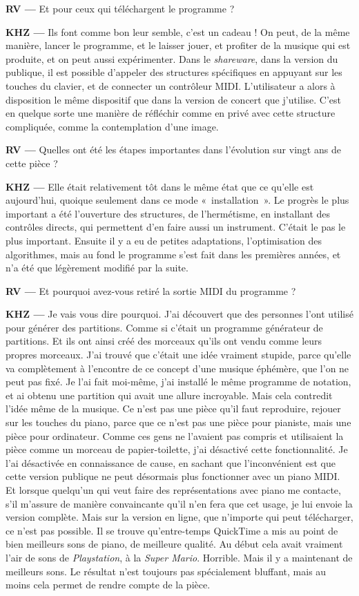 \documentclass[a4paper,12pt]{article}
\newcommand{\guill}[1]{«~#1~»}
\begin{document}
\textbf{RV ---} Et pour ceux qui téléchargent le programme ?

\textbf{KHZ ---} Ils font comme bon leur semble, c'est un cadeau ! On peut, de la même manière, lancer le programme, et le laisser jouer, et profiter de la musique qui est produite, et on peut aussi expérimenter. Dans le \emph{shareware}, dans la version du publique, il est possible d'appeler des structures spécifiques en appuyant sur les touches du clavier, et de connecter un contrôleur MIDI. L'utilisateur a alors à disposition le même dispositif que dans la version de concert que j'utilise. C'est en quelque sorte une manière de réfléchir comme en privé avec cette structure compliquée, comme la contemplation d'une image.

\textbf{RV ---} Quelles ont été les étapes importantes dans l'évolution sur vingt ans de cette pièce ?

\textbf{KHZ ---} Elle était relativement tôt dans le même état que ce qu'elle est aujourd'hui, quoique seulement dans ce mode \guill{installation}. Le progrès le plus important a été l'ouverture des structures, de l'hermétisme, en installant des contrôles directs, qui permettent d'en faire aussi un instrument. C'était le pas le plus important. Ensuite il y a eu de petites adaptations, l'optimisation des algorithmes, mais au fond le programme s'est fait dans les premières années, et n'a été que légèrement modifié par la suite.

\textbf{RV ---} Et pourquoi avez-vous retiré la sortie MIDI du programme ?

\textbf{KHZ ---} Je vais vous dire pourquoi. J'ai découvert que des personnes l'ont utilisé pour générer des partitions. Comme si c'était un programme générateur de partitions. Et ils ont ainsi créé des morceaux qu'ils ont vendu comme leurs propres morceaux. J'ai trouvé que c'était une idée vraiment stupide, parce qu'elle va complètement à l'encontre de ce concept d'une musique éphémère, que l'on ne peut pas fixé. Je l'ai fait moi-même, j'ai installé le même programme de notation, et ai obtenu une partition qui avait une allure incroyable. Mais cela contredit l'idée même de la musique. Ce n'est pas une pièce qu'il faut reproduire, rejouer sur les touches du piano, parce que ce n'est pas une pièce pour pianiste, mais une pièce pour ordinateur. Comme ces gens ne l'avaient pas compris et utilisaient la pièce comme un morceau de papier-toilette, j'ai désactivé cette fonctionnalité. Je l'ai désactivée en connaissance de cause, en sachant que l'inconvénient est que cette version publique ne peut désormais plus fonctionner avec un piano MIDI. Et lorsque quelqu'un qui veut faire des représentations avec piano me contacte, s'il m'assure de manière convaincante qu'il n'en fera que cet usage, je lui envoie la version complète. Mais sur la version en ligne, que n'importe qui peut télécharger, ce n'est pas possible. Il se trouve qu'entre-temps QuickTime a mis au point de bien meilleurs sons de piano, de meilleure qualité. Au début cela avait vraiment l'air de sons de \emph{Playstation}, à la \emph{Super Mario}. Horrible. Mais il y a maintenant de meilleurs sons. Le résultat n'est toujours pas spécialement bluffant, mais au moins cela permet de rendre compte de la pièce.
\end{document}
